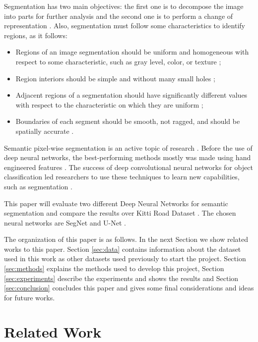 \documentclass[10pt,twocolumn,letterpaper]{article}
\begin{document}
Segmentation has two main objectives: the first one is to decompose the image into parts for further analysis and the second one is to perform a change of representation \cite{DOMINGUEZ}. Also, segmentation must follow some characteristics to identify regions, as it follows:

\begin{itemize}
 \item Regions of an image segmentation should be uniform and homogeneous with respect to some characteristic, such as gray level, color, or texture \cite{DOMINGUEZ};
 \item Region interiors should be simple and without many small holes \cite{DOMINGUEZ};
 \item Adjacent regions of a segmentation should have significantly different values with respect to the characteristic on which they are uniform \cite{DOMINGUEZ};
 \item Boundaries of each segment should be smooth, not ragged, and should be spatially accurate \cite{DOMINGUEZ}.
\end{itemize}

Semantic pixel-wise segmentation is an active topic of research \cite{SEGNET}. Before the use of deep neural networks, the best-performing methods mostly was made using hand engineered features \cite{SEGNET}. The success of deep convolutional neural networks for object classification led researchers to use these techniques to learn new capabilities, such as segmentation \cite{SEGNET}.

This paper will evaluate two different Deep Neural Networks for semantic segmentation and compare the results over Kitti Road Dataset \cite{KITTI}. The chosen neural networks are SegNet \cite{SEGNET} and U-Net \cite{UNET}.

The organization of this paper is as follows. In the next Section we show related works to this paper. Section \ref{sec:data} contains information about the dataset used in this work as other datasets used previously to start the project. Section \ref{sec:methods} explains the methods used to develop this project, Section \ref{sec:experiments} describe the experiments and shows the results and Section \ref{sec:conclusion} concludes this paper and gives some final considerations and ideas for future works.


\section{Related Work} \label{sec:related_work}
\end{document}
